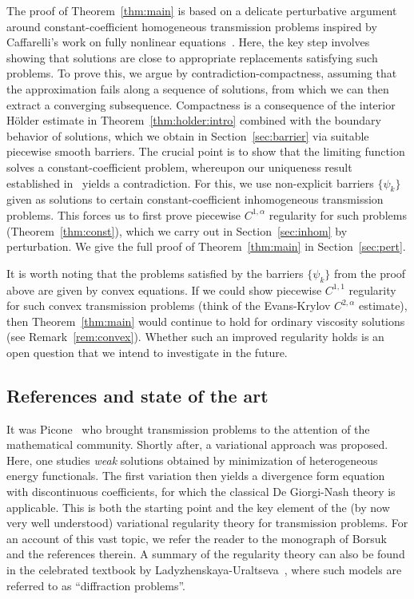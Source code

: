 \documentclass[letter,11pt]{amsart}
\theoremstyle{definition}
\numberwithin{equation}{section}
\begin{document}
The proof of Theorem~\ref{thm:main} is based on a delicate perturbative argument around constant-coefficient homogeneous transmission problems inspired by Caffarelli's work on fully nonlinear equations~\cite{C1,C2}.
Here, the key step involves showing that solutions are close to appropriate replacements satisfying such problems.
To prove this, we argue by contradiction-compactness, assuming that the approximation fails along a sequence of solutions, from which we can then extract a converging subsequence.
Compactness is a consequence of the interior H\"{o}lder estimate in Theorem~\ref{thm:holder:intro} combined with the boundary behavior of solutions, which we obtain in Section~\ref{sec:barrier} via suitable piecewise smooth barriers. 
The crucial point is to show that the limiting function solves a constant-coefficient problem, whereupon our uniqueness result established in~\cite{E} yields a contradiction.
For this, we use non-explicit barriers $\{\psi_k\}$ given as solutions to certain constant-coefficient inhomogeneous transmission problems.
This forces us to first prove piecewise $C^{1,\alpha}$ regularity for such problems (Theorem~\ref{thm:const}), 
which we carry out in Section~\ref{sec:inhom} by perturbation.
We give the full proof of Theorem~\ref{thm:main} in Section~\ref{sec:pert}.

\medskip


It is worth noting that the problems satisfied by the barriers $\{\psi_k\}$ from the proof above are given by convex equations.
If we could show piecewise $C^{1,1}$ regularity for such convex transmission problems (think of the Evans-Krylov $C^{2,\alpha}$ estimate), then Theorem~\ref{thm:main} would continue to hold for ordinary viscosity solutions (see Remark~\ref{rem:convex}).
Whether such an improved regularity holds is an open question that we intend to investigate in the future.

\medskip

\subsection{References and state of the art}

It was Picone~\cite{P} who brought transmission problems to the attention of the mathematical community.
Shortly after, a variational approach was proposed.
Here, one studies \emph{weak} solutions obtained by minimization of heterogeneous energy functionals.
The first variation then yields a divergence form equation with discontinuous coefficients, for which the classical De Giorgi-Nash theory is applicable.
This is both the starting point and the key element of the (by now very well understood) variational regularity theory for transmission problems.
For an account of this vast topic, we refer the reader to the monograph of Borsuk~\cite{B} and the references therein.
A summary of the regularity theory can also be found in the celebrated textbook by Ladyzhenskaya-Uraltseva~\cite[Ch.~3.16]{LU}, where such models are referred to as ``diffraction problems''.
\end{document}
